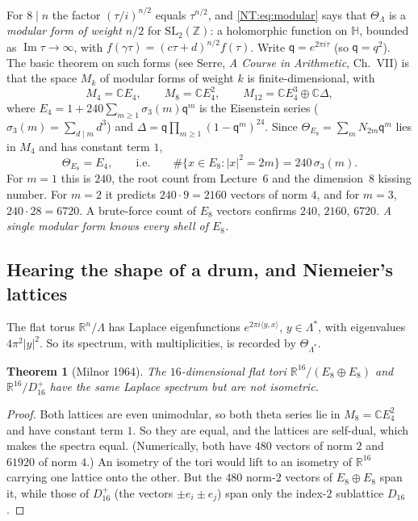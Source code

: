 \documentclass[11pt,openany]{book}
\theoremstyle{plain}
\newtheorem{theorem}{Theorem}[chapter]
\theoremstyle{definition}
\theoremstyle{remark}
\newcommand{\R}{\mathbb{R}}
\newcommand{\Z}{\mathbb{Z}}
\newcommand{\C}{\mathbb{C}}
\newcommand{\Lat}{\Lambda}             %
\newcommand{\SL}{\mathrm{SL}}
\newcommand{\abs}[1]{\left\lvert #1 \right\rvert}
\newcommand{\ip}[2]{\langle #1, #2\rangle}
\begin{document}
For $8\mid n$ the factor $(\tau/i)^{n/2}$ equals $\tau^{n/2}$, and \eqref{NT:eq:modular} says that
$\Theta_\Lat$ is a \emph{modular form of weight $n/2$} for $\SL_2(\Z)$: a holomorphic function on
$\mathbb H$, bounded as $\operatorname{Im}\tau\to\infty$, with $f(\gamma\tau)=(c\tau+d)^{n/2}f(\tau)$.
Write $\mathsf q=e^{2\pi i\tau}$ (so $\mathsf q=q^2$). The basic theorem on such forms (see Serre,
\emph{A Course in Arithmetic}, Ch.~VII) is that the space $M_k$ of modular forms of weight $k$ is
finite-dimensional, with
\[
  M_4=\C E_4,\qquad M_8=\C E_4^2,\qquad M_{12}=\C E_4^3\oplus\C\Delta,
\]
where $E_4=1+240\sum_{m\ge1}\sigma_3(m)\mathsf q^m$ is the Eisenstein series
($\sigma_3(m)=\sum_{d\mid m}d^3$) and $\Delta=\mathsf q\prod_{m\ge1}(1-\mathsf q^m)^{24}$. Since
$\Theta_{E_8}=\sum_mN_{2m}\mathsf q^m$ lies in $M_4$ and has constant term $1$,
\begin{equation}\label{NT:eq:E8theta}
  \Theta_{E_8}=E_4,\qquad\text{i.e.}\qquad
  \#\{x\in E_8:\abs x^2=2m\}=240\,\sigma_3(m).
\end{equation}
For $m=1$ this is $240$, the root count from Lecture~6 and the dimension~$8$ kissing number. For $m=2$
it predicts $240\cdot9=2160$ vectors of norm $4$, and for $m=3$, $240\cdot28=6720$. A brute-force count
of $E_8$ vectors confirms $240,\,2160,\,6720$. \emph{A single modular form knows every shell of $E_8$.}

\subsection*{Hearing the shape of a drum, and Niemeier's lattices}

The flat torus $\R^n/\Lat$ has Laplace eigenfunctions $e^{2\pi i\ip yx}$, $y\in\Lat^*$, with eigenvalues
$4\pi^2\abs y^2$. So its spectrum, with multiplicities, is recorded by $\Theta_{\Lat^*}$.

\begin{theorem}[Milnor 1964]\label{NT:thm:milnor}
The $16$-dimensional flat tori $\R^{16}/(E_8\oplus E_8)$ and $\R^{16}/D_{16}^+$ have the same Laplace
spectrum but are not isometric.
\end{theorem}

\begin{proof}
Both lattices are even unimodular, so both theta series lie in $M_8=\C E_4^2$ and have constant term $1$.
So they are equal, and the lattices are self-dual, which makes the spectra equal. (Numerically, both have
$480$ vectors of norm $2$ and $61920$ of norm $4$.) An isometry of the tori would lift to an isometry of
$\R^{16}$ carrying one lattice onto the other. But the $480$ norm-$2$ vectors of $E_8\oplus E_8$ span it,
while those of $D_{16}^+$ (the vectors $\pm e_i\pm e_j$) span only the index-$2$ sublattice $D_{16}$.
\end{proof}
\end{document}
